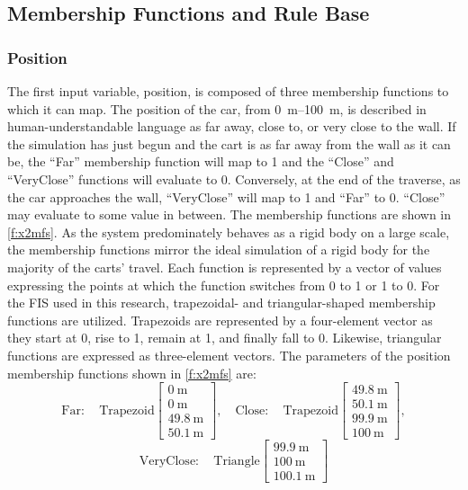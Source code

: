 \subsection{Membership Functions and Rule Base} \subsubsection{Position} The first input variable, position,
is composed of three membership functions to which it can map. The position of the car, from
\SIrange{0}{100}{\metre}, is described in human-understandable language as far away, close to, or very close
to the wall. If the simulation has just begun and the cart is as far away from the wall as it can be, the
``Far'' membership function will map to 1 and the ``Close'' and ``VeryClose'' functions will evaluate to 0.
Conversely, at the end of the traverse, as the car approaches the wall, ``VeryClose'' will map to 1 and
``Far'' to 0. ``Close'' may evaluate to some value in between. The membership functions are shown in
\cref{f:x2mfs}. As the system predominately behaves as a rigid body on a large scale, the membership
functions mirror the ideal simulation of a rigid body for the majority of the carts' travel. Each function is
represented by a vector of values expressing the points at which the function switches from 0 to 1 or 1 to 0.
For the FIS used in this research, trapezoidal- and triangular-shaped membership functions are utilized.
Trapezoids are represented by a four-element vector as they start at 0, rise to 1, remain at 1, and finally
fall to 0. Likewise, triangular functions are expressed as three-element vectors. The parameters of the
position membership functions shown in \cref{f:x2mfs} are: \begin{displaymath} \mathrm{Far:}\quad
\mathrm{Trapezoid}\begin{bmatrix} \SI{0}{\metre}\\\SI{0}{\metre}\\\SI{49.8}{\metre}\\\SI{50.1}{\metre}
\end{bmatrix}, \quad \mathrm{Close:}\quad \mathrm{Trapezoid}\begin{bmatrix}
    \SI{49.8}{\metre}\\\SI{50.1}{\metre}\\\SI{99.9}{\metre}\\\SI{100}{\metre} \end{bmatrix}, \end{displaymath}
\begin{displaymath} \mathrm{VeryClose:}\quad \mathrm{Triangle}\begin{bmatrix}
\SI{99.9}{\metre}\\\SI{100}{\metre}\\\SI{100.1}{\metre} \end{bmatrix} \end{displaymath}

